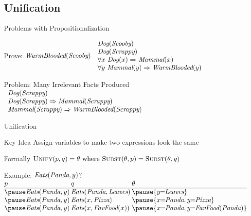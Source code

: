 \documentclass[12pt]{beamer}
\newcommand{\SC}[1]{\mbox{\sc#1}}
\newcommand{\EM}[1]{\mbox{\em#1}}
\newcommand{\limpl}{\Rightarrow}
\begin{document}
\subsection{Unification}
\begin{frame}{Problems with Propositionalization}
	\begin{block}{Prove: $\EM{WarmBlooded}(\EM{Scooby})$}
		$
		\begin{array}{l}
			\EM{Dog}(\EM{Scooby}) \\
			\EM{Dog}(\EM{Scrappy}) \\
			\forall x\ \EM{Dog}(x) \limpl \EM{Mammal}(x) \\
			\forall y\ \EM{Mammal}(y) \limpl \EM{WarmBlooded}(y) \\
		\end{array}
		$
	\end{block}
	\begin{block}{Problem: Many Irrelevant Facts Produced}
		$
		\begin{array}{l}
			\EM{Dog}(\EM{Scrappy}) \\
			\EM{Dog}(\EM{Scrappy}) \limpl \EM{Mammal}(\EM{Scrappy}) \\
			\EM{Mammal}(\EM{Scrappy}) \limpl \EM{WarmBlooded}(\EM{Scrappy}) \\
		\end{array}
		$
	\end{block}
\end{frame}
\begin{frame}{Unification}
	\begin{block}{Key Idea}
		Assign variables to make two expressions look the same
	\end{block}
	\begin{block}{Formally}
		$\SC{Unify}(p, q) = \theta \mbox{ where } \SC{Subst}(\theta, p) = \SC{Subst}(\theta, q)$
	\end{block}
	\pause
	\begin{block}{Example: $\EM{Eats}(\EM{Panda}, y)$?}
		\footnotesize
		$
		\begin{array}{@{}l@{\hspace{.2em}}l@{\hspace{.2em}}l@{}}
			p                              & q                                  &
				\theta \\
			\hline
			\pause\EM{Eats}(\EM{Panda}, y) & \EM{Eats}(\EM{Panda}, \EM{Leaves}) &
				\pause\{y\!\!=\!\!\EM{Leaves}\} \\
			\pause\EM{Eats}(\EM{Panda}, y) & \EM{Eats}(x, \EM{Pizza})           &
				\pause\{x\!\!=\!\!\EM{Panda}, y\!\!=\!\!\EM{Pizza}\} \\
			\pause\EM{Eats}(\EM{Panda}, y) & \EM{Eats}(x, \EM{FavFood}(x))      &
				\pause\{x\!\!=\!\!\EM{Panda}, y\!\!=\!\!\EM{FavFood}(\EM{Panda})\}
		\end{array}
		$
	\end{block}
\end{frame}
\end{document}

